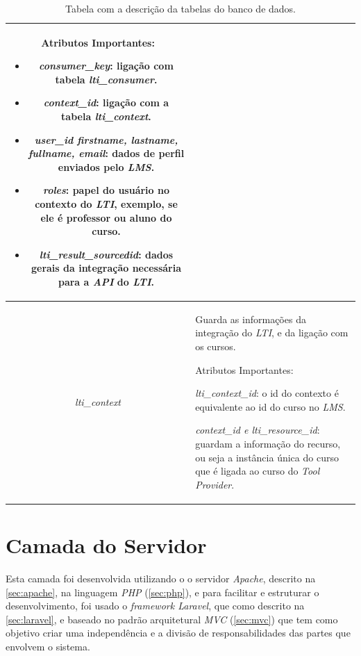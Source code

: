\begin{table}[htp]
\begin{center}
\begin{tabular}{|c|p{11cm}|}
                  Atributos Importantes:
                  \begin{itemize}
                      \item \textit{consumer\_key}: ligação com tabela \textit{lti\_consumer}.
                      \item \textit{context\_id}: ligação com a tabela \textit{lti\_context}.
                      \item \textit{user\_id firstname, lastname, fullname, email}: dados de perfil enviados pelo \textit{LMS}.
                      \item \textit{roles}: papel do usuário no contexto do \textit{LTI}, exemplo, se ele é professor ou aluno do curso.
                      \item \textit{lti\_result\_sourcedid}: dados gerais da integração necessária para a \textit{API} do \textit{LTI}.
                    \end{itemize}
              \\
              \hline \textit{lti\_context} &
                  Guarda as informações da integração do \textit{LTI}, e da ligação com os cursos.
                  
                  Atributos Importantes:
                  \item \textit{lti\_context\_id}: o id do contexto é equivalente ao id do curso no \textit{LMS}.
                  \item \textit{context\_id e lti\_resource\_id}: guardam a informação do recurso, ou seja a instância única do curso que é ligada ao curso do \textit{Tool Provider}.
                  \\
            \hline 
    \end{tabular} 
    \caption{Tabela com a descrição da tabelas do banco de dados.}
    \label{tbl:estrutura-banco-dados}
    \end{center}
\end{table}

\section{Camada do Servidor}

Esta camada foi desenvolvida utilizando o o servidor \textit{Apache}, descrito na \autoref{sec:apache}, na linguagem \textit{PHP} (\autoref{sec:php}), e para facilitar e estruturar o desenvolvimento, foi usado o \textit{framework Laravel}, que como descrito na \autoref{sec:laravel}, e baseado no padrão arquitetural \textit{MVC} (\autoref{sec:mvc}) que tem como objetivo criar uma independência e a divisão de responsabilidades das partes que envolvem o sistema.

